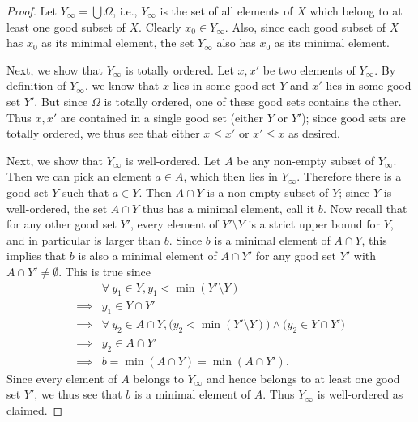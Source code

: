 \begin{proof}
    Let \(Y_{\infty} = \bigcup \Omega\), i.e., \(Y_{\infty}\) is the set of all elements of \(X\) which belong to at least one good subset of \(X\).
    Clearly \(x_0 \in Y_{\infty}\).
    Also, since each good subset of \(X\) has \(x_0\) as its minimal element, the set \(Y_{\infty}\) also has \(x_0\) as its minimal element.

    Next, we show that \(Y_{\infty}\) is totally ordered.
    Let \(x, x'\) be two elements of \(Y_{\infty}\).
    By definition of \(Y_{\infty}\), we know that \(x\) lies in some good set \(Y\) and \(x'\) lies in some good set \(Y'\).
    But since \(\Omega\) is totally ordered, one of these good sets contains the other.
    Thus \(x, x'\) are contained in a single good set (either \(Y\) or \(Y'\));
    since good sets are totally ordered, we thus see that either \(x \leq x'\) or \(x' \leq x\) as desired.

    Next, we show that \(Y_{\infty}\) is well-ordered.
    Let \(A\) be any non-empty subset of \(Y_{\infty}\).
    Then we can pick an element \(a \in A\), which then lies in \(Y_{\infty}\).
    Therefore there is a good set \(Y\) such that \(a \in Y\).
    Then \(A \cap Y\) is a non-empty subset of \(Y\);
    since \(Y\) is well-ordered, the set \(A \cap Y\) thus has a minimal element, call it \(b\).
    Now recall that for any other good set \(Y'\), every element of \(Y' \setminus Y\) is a strict upper bound for \(Y\), and in particular is larger than \(b\).
    Since \(b\) is a minimal element of \(A \cap Y\), this implies that \(b\) is also a minimal element of \(A \cap Y'\) for any good set \(Y'\) with \(A \cap Y' \neq \emptyset\).
    This is true since
    \begin{align*}
                 & \forall\ y_1 \in Y, y_1 < \min(Y' \setminus Y)                                                    \\
        \implies & y_1 \in Y \cap Y'                                                                                 \\
        \implies & \forall\ y_2 \in A \cap Y, \big(y_2 < \min(Y' \setminus Y)\big) \land \big(y_2 \in Y \cap Y'\big) \\
        \implies & y_2 \in A \cap Y'                                                                                 \\
        \implies & b = \min(A \cap Y) = \min(A \cap Y').
    \end{align*}
    Since every element of \(A\) belongs to \(Y_{\infty}\) and hence belongs to at least one good set \(Y'\), we thus see that \(b\) is a minimal element of \(A\).
    Thus \(Y_{\infty}\) is well-ordered as claimed.


\end{proof}
